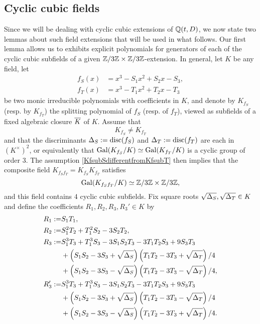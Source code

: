 \subsection{Cyclic cubic fields}

Since we will be dealing with cyclic cubic extensions of $\mathbb{Q}(t,D)$, we now state two lemmas about such field extensions that will be used in what follows.
Our first lemma allows us to exhibits explicit polynomials for generators of each of the cyclic cubic  subfields of a given $\mathbb{Z}/3\mathbb{Z} \times \mathbb{Z}/3\mathbb{Z}$-extension.  In general, let $K$ be any field, let
\begin{equation} \label{defoffsubSandfsubT}
\begin{split}
f_S(x) &= x^3 - S_1x^2 + S_2 x - S_3, \\
f_T(x) &= x^3 - T_1x^2 + T_2 x - T_3
\end{split}
\end{equation}
be two monic irreducible polynomials with coefficients in $K$, and denote by $K_{f_S}$ (resp. by $K_{f_T}$) the splitting polynomial of $f_S$ (resp. of $f_T$), viewed as subfields of a fixed algebraic closure $\overline{K}$ of $K$.  Assume that 
\begin{equation} \label{KfsubSdifferentfromKfsubT}
K_{f_S} \neq K_{f_T}
\end{equation}
and that the discriminants $\Delta_S := \operatorname{disc}(f_S)$ and $\Delta_T := \operatorname{disc}(f_T)$ are each in $\left( K^\times \right)^2$, or equivalently that $\operatorname{Gal}(K_{f_S}/K) \simeq \operatorname{Gal}(K_{f_T}/K)$ is a cyclic group of order $3$.  The assumption \eqref{KfsubSdifferentfromKfsubT} then implies that the composite field $K_{f_Sf_T} = K_{f_S}K_{f_T}$ satisfies
\begin{equation} \label{galoisgroupisZmod3timesZmod3}
\operatorname{Gal}(K_{f_Sf_T}/K) \simeq \mathbb{Z}/3\mathbb{Z} \times \mathbb{Z}/3\mathbb{Z},
\end{equation}
and this field contains $4$ cyclic cubic subfields.  Fix square roots $\sqrt{\Delta_S}, \sqrt{\Delta_T} \in K$ and define the coefficients $R_1, R_2, R_3, R_3' \in K$ by
\begin{equation} \label{defofRsubis}
\begin{split}
R_1 := &S_1 T_1, \\
R_2 := &S_1^2 T_2 + T_1^2 S_2 - 3S_2T_2, \\
R_3 := &S_1^3 T_3 + T_1^3 S_3 - 3S_1 S_2 T_3 - 3 T_1 T_2 S_3 + 9S_3 T_3 \\
&+ \left( S_1S_2 - 3S_3 + \sqrt{\Delta_S} \right) \left( T_1 T_2 - 3T_3 + \sqrt{\Delta_T} \right) / 4 \\
&+ \left( S_1S_2 - 3S_3 - \sqrt{\Delta_S} \right) \left( T_1 T_2 - 3T_3 - \sqrt{\Delta_T} \right) / 4, \\
R_3' := &S_1^3 T_3 + T_1^3 S_3 - 3S_1 S_2 T_3 - 3 T_1 T_2 S_3 + 9S_3 T_3 \\
&+ \left( S_1S_2 - 3S_3 + \sqrt{\Delta_S} \right) \left( T_1 T_2 - 3T_3 - \sqrt{\Delta_T} \right) / 4 \\
&+ \left( S_1S_2 - 3S_3 - \sqrt{\Delta_S} \right) \left( T_1 T_2 - 3T_3 + \sqrt{\Delta_T} \right) / 4.
\end{split}
\end{equation}
